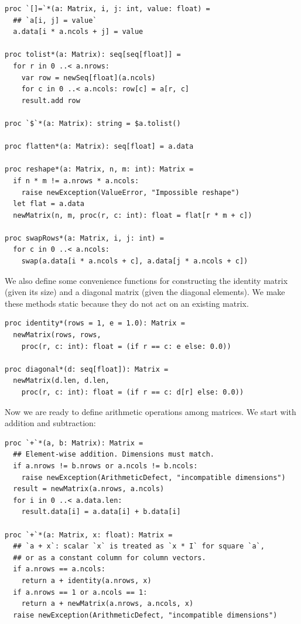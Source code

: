 \documentclass[justified, sixbynine]{tufte-book}
\def\ft{\small\tt}
\theoremstyle{plain}%
\newtheorem * {corollary}{Corollary}
\theoremstyle{definition}
\theoremstyle{remark}
\newtheorem * {remark}{Remark}
\newtheorem * {note}{Note}
\begin{document}
\begin{fullwidth}
\begin{lstlisting}[caption={in file: {\ft nlib.nim}}]
proc `[]=`*(a: Matrix, i, j: int, value: float) =
  ## `a[i, j] = value`
  a.data[i * a.ncols + j] = value

proc tolist*(a: Matrix): seq[seq[float]] =
  for r in 0 ..< a.nrows:
    var row = newSeq[float](a.ncols)
    for c in 0 ..< a.ncols: row[c] = a[r, c]
    result.add row

proc `$`*(a: Matrix): string = $a.tolist()

proc flatten*(a: Matrix): seq[float] = a.data

proc reshape*(a: Matrix, n, m: int): Matrix =
  if n * m != a.nrows * a.ncols:
    raise newException(ValueError, "Impossible reshape")
  let flat = a.data
  newMatrix(n, m, proc(r, c: int): float = flat[r * m + c])

proc swapRows*(a: Matrix, i, j: int) =
  for c in 0 ..< a.ncols:
    swap(a.data[i * a.ncols + c], a.data[j * a.ncols + c])
\end{lstlisting}


We also define some convenience functions for constructing the identity matrix (given its size) and a diagonal matrix (given the diagonal elements). We make these methods static because they do not act on an existing matrix.

\begin{lstlisting}[caption={in file: {\ft nlib.nim}}]
proc identity*(rows = 1, e = 1.0): Matrix =
  newMatrix(rows, rows,
    proc(r, c: int): float = (if r == c: e else: 0.0))

proc diagonal*(d: seq[float]): Matrix =
  newMatrix(d.len, d.len,
    proc(r, c: int): float = (if r == c: d[r] else: 0.0))
\end{lstlisting}

Now we are ready to define arithmetic operations among matrices. We start with addition and subtraction:


\begin{lstlisting}[caption={in file: {\ft nlib.nim}}]
proc `+`*(a, b: Matrix): Matrix =
  ## Element-wise addition. Dimensions must match.
  if a.nrows != b.nrows or a.ncols != b.ncols:
    raise newException(ArithmeticDefect, "incompatible dimensions")
  result = newMatrix(a.nrows, a.ncols)
  for i in 0 ..< a.data.len:
    result.data[i] = a.data[i] + b.data[i]

proc `+`*(a: Matrix, x: float): Matrix =
  ## `a + x`: scalar `x` is treated as `x * I` for square `a`,
  ## or as a constant column for column vectors.
  if a.nrows == a.ncols:
    return a + identity(a.nrows, x)
  if a.nrows == 1 or a.ncols == 1:
    return a + newMatrix(a.nrows, a.ncols, x)
  raise newException(ArithmeticDefect, "incompatible dimensions")


\end{lstlisting}
\end{fullwidth}
\end{document}
